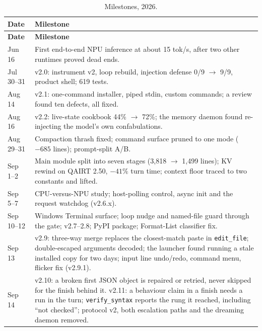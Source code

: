 \documentclass[11pt]{article}
\newcommand{\code}[1]{\texttt{\small #1}}
\begin{document}
{\small
\begin{longtable}{@{}lp{12.4cm}@{}}
\caption{Milestones, 2026.}\label{tab:timeline}\\
\toprule
\textbf{Date} & \textbf{Milestone} \\
\midrule
\endfirsthead
\toprule
\textbf{Date} & \textbf{Milestone} \\
\midrule
\endhead
\bottomrule
\endlastfoot
Jun 16 & First end-to-end NPU inference at about 15 tok/s, after two other runtimes proved dead ends. \\
Jul 30--31 & v2.0: instrument v2, loop rebuild, injection defense 0/9 $\to$ 9/9, product shell; 619 tests. \\
Aug 14 & v2.1: one-command installer, piped stdin, custom commands; a review found ten defects, all fixed. \\
Aug 16 & v2.2: live-state cookbook 44\% $\to$ 72\%; the memory daemon found re-injecting the model's own confabulations. \\
Aug 29--31 & Compaction thrash fixed; command surface pruned to one mode ($-685$ lines); prompt-split A/B. \\
Sep 1--2 & Main module split into seven stages (3{,}818 $\to$ 1{,}499 lines); KV rewind on QAIRT 2.50, $-41\%$ turn time; context floor traced to two constants and lifted. \\
Sep 5--7 & CPU-versus-NPU study; host-polling control, async init and the request watchdog (v2.6.x). \\
Sep 10--12 & Windows Terminal surface; loop nudge and named-file guard through the gate; v2.7--2.8; PyPI package; Format-List classifier fix. \\
Sep 13 & v2.9: three-way merge replaces the closest-match paste in \code{edit\_file}; double-escaped arguments decoded; the launcher found running a stale installed copy for two days; input line undo/redo, command menu, flicker fix (v2.9.1). \\
Sep 14 & v2.10: a broken first JSON object is repaired or retried, never skipped for the finish behind it. v2.11: a behaviour claim in a finish needs a run in the turn; \code{verify\_syntax} reports the rung it reached, including ``not checked''; protocol v2, both escalation paths and the dreaming daemon removed. \\
\end{longtable}}
\end{document}

